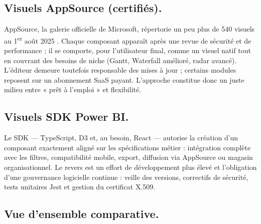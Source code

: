 \subsection{Visuels AppSource (certifiés).}  
AppSource, la galerie officielle de Microsoft, répertorie un peu plus de 540 visuels au 1\textsuperscript{er} août 2025 \parencite{AppSourceCount2025}. Chaque composant apparaît après une revue de sécurité et de performance ; il se comporte, pour l’utilisateur final, comme un visuel natif tout en couvrant des besoins de niche (Gantt, Waterfall amélioré, radar avancé). L’éditeur demeure toutefois responsable des mises à jour ; certains modules reposent sur un abonnement SaaS payant. L’approche constitue donc un juste milieu entre « prêt à l’emploi » et flexibilité.


\subsection{Visuels SDK Power BI.}  
Le SDK — TypeScript, D3 et, au besoin, React — autorise la création d’un composant exactement aligné sur les spécifications métier : intégration complète avec les filtres, compatibilité mobile, export, diffusion via AppSource ou magasin organisationnel. Le revers est un effort de développement plus élevé et l’obligation d’une gouvernance logicielle continue : veille des versions, correctifs de sécurité, tests unitaires Jest et gestion du certificat X.509.

\subsection{Vue d’ensemble comparative.}

